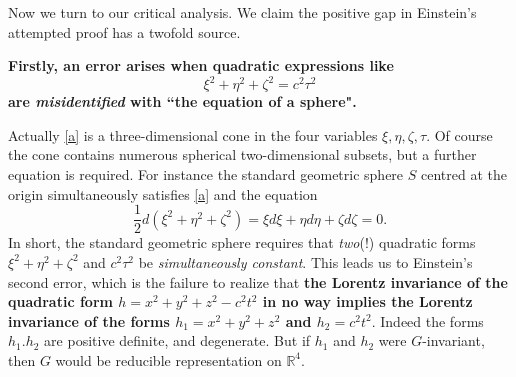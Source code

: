 \documentclass[12pt]{amsart}
\theoremstyle{definition}
\theoremstyle{remark}
\newcommand{\bR}{\mathbb{R}}
\newcommand{\del}{\partial}
\begin{document}





Now we turn to our critical analysis. We claim the positive gap in Einstein's attempted proof has a twofold source. 

\textbf{Firstly, an error arises when quadratic expressions like \begin{equation}\label{a}\xi^2+\eta^2+\zeta^2=c^2 \tau^2
\end{equation} are \emph{misidentified} with ``the equation of a sphere".}

Actually \eqref{a} is a three-dimensional cone in the four variables $\xi, \eta, \zeta, \tau$. Of course the cone contains numerous spherical two-dimensional subsets, but a further equation is required. For instance the standard geometric sphere $S$ centred at the origin simultaneously satisfies \eqref{a} and the equation $$\frac{1}{2}d(\xi^2+\eta^2+\zeta^2)=\xi d\xi+\eta d\eta +\zeta d\zeta=0.$$ In short, the standard geometric sphere requires that \emph{two}(!) quadratic forms $\xi^2+\eta^2+\zeta^2$ and $c^2\tau^2$ be \emph{simultaneously constant}. This leads us to Einstein's second error, which is the failure to realize that \textbf{the Lorentz invariance of the quadratic form $h=x^2+y^2+z^2-c^2t^2$ in no way implies the Lorentz invariance of the forms $h_1=x^2+y^2+z^2$ and $h_2=c^2 t^2.$ } Indeed the forms $h_1. h_2$ are positive definite, and degenerate. But if $h_1$ and $h_2$ were $G$-invariant, then $G$ would be reducible representation on $\bR^4$. 




\end{document}
